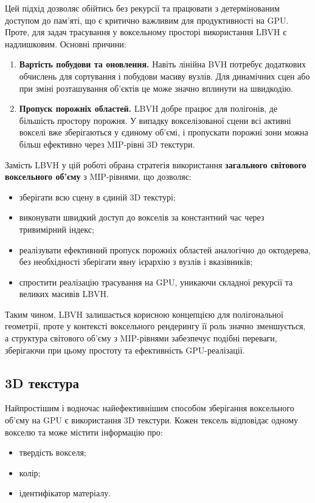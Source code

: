 Цей підхід дозволяє обійтись без рекурсії та працювати з детермінованим доступом до пам'яті, що є критично важливим для продуктивності на GPU. Проте, для задач трасування у воксельному просторі використання LBVH є надлишковим. Основні причини:
\begin{enumerate}[itemsep=0pt, topsep=0pt]
    \item \textbf{Вартість побудови та оновлення.} Навіть лінійна BVH потребує додаткових обчислень для сортування і побудови масиву вузлів. Для динамічних сцен або при зміні розташування об'єктів це може значно вплинути на швидкодію.
    \item \textbf{Пропуск порожніх областей.} LBVH добре працює для полігонів, де більшість простору порожня. У випадку вокселізованої сцени всі активні вокселі вже зберігаються у єдиному об'ємі, і пропускати порожні зони можна більш ефективно через MIP-рівні 3D текстури.
\end{enumerate}

Замість LBVH у цій роботі обрана стратегія використання \textbf{загального світового воксельного об'єму}  з MIP-рівнями, що дозволяє:
\begin{itemize}[itemsep=0pt, topsep=0pt, label=$\diamond$]
    \item зберігати всю сцену в єдиній 3D текстурі;
    \item виконувати швидкий доступ до вокселів за константний час через тривимірний індекс;
    \item реалізувати ефективний пропуск порожніх областей аналогічно до октодерева, без необхідності зберігати явну ієрархію з вузлів і вказівників;
    \item спростити реалізацію трасування на GPU, уникаючи складної рекурсії та великих масивів LBVH.
\end{itemize}

Таким чином, LBVH залишається корисною концепцією для полігональної геометрії, проте у контексті воксельного рендерингу її роль значно зменшується, а структура світового об'єму з MIP-рівнями забезпечує подібні переваги, зберігаючи при цьому простоту та ефективність GPU-реалізації.

\subsection{3D текстура}

Найпростішим і водночас найефективнішим способом зберігання воксельного об'єму на GPU є використання 3D текстури. Кожен тексель відповідає одному вокселю та може містити інформацію про:
\begin{itemize}[itemsep=0pt, topsep=0pt, label=$\diamond$]
    \item твердість вокселя;
    \item колір;
    \item ідентифікатор матеріалу.
\end{itemize}

